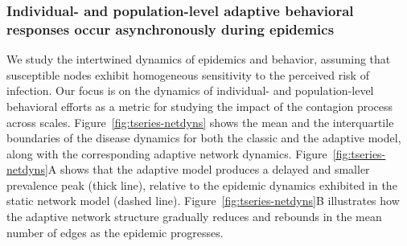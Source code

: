 \documentclass[9pt,twocolumn,twoside]{pnas-new}
\begin{document}
\subsubsection*{Individual- and population-level adaptive behavioral responses occur asynchronously during epidemics}
%
We study the intertwined dynamics of epidemics and behavior, assuming that susceptible nodes exhibit homogeneous sensitivity to the perceived risk of infection.
%
Our focus is on the dynamics of individual- and population-level behavioral efforts as a metric for studying the impact of the contagion process across scales.
%
Figure~\ref{fig:tseries-netdyns} shows the mean and the interquartile boundaries of the disease dynamics for both the classic and the adaptive model, along with the corresponding adaptive network dynamics.
%
Figure~\ref{fig:tseries-netdyns}A shows that the adaptive model produces a delayed and smaller prevalence peak (thick line), relative to the epidemic dynamics exhibited in the static network model (dashed line). 
Figure~\ref{fig:tseries-netdyns}B illustrates how the adaptive network structure gradually reduces and rebounds in the mean number of edges as the epidemic progresses.
\end{document}
